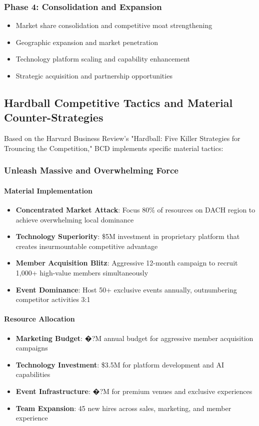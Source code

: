 \subsubsection{Phase 4: Consolidation and Expansion}
\begin{itemize}
    \item Market share consolidation and competitive moat strengthening
    \item Geographic expansion and market penetration
    \item Technology platform scaling and capability enhancement
    \item Strategic acquisition and partnership opportunities
\end{itemize}

\subsection{Hardball Competitive Tactics and Material Counter-Strategies}

Based on the Harvard Business Review's "Hardball: Five Killer Strategies for Trouncing the Competition," BCD implements specific material tactics:

\subsubsection{Unleash Massive and Overwhelming Force}

\paragraph{Material Implementation}
\begin{itemize}
    \item \textbf{Concentrated Market Attack}: Focus 80\% of resources on DACH region to achieve overwhelming local dominance
    \item \textbf{Technology Superiority}: \$5M investment in proprietary platform that creates insurmountable competitive advantage
    \item \textbf{Member Acquisition Blitz}: Aggressive 12-month campaign to recruit 1,000+ high-value members simultaneously
    \item \textbf{Event Dominance}: Host 50+ exclusive events annually, outnumbering competitor activities 3:1
\end{itemize}

\paragraph{Resource Allocation}
\begin{itemize}
    \item \textbf{Marketing Budget}: �?M annual budget for aggressive member acquisition campaigns
    \item \textbf{Technology Investment}: \$3.5M for platform development and AI capabilities
    \item \textbf{Event Infrastructure}: �?M for premium venues and exclusive experiences
    \item \textbf{Team Expansion}: 45 new hires across sales, marketing, and member experience
\end{itemize}

